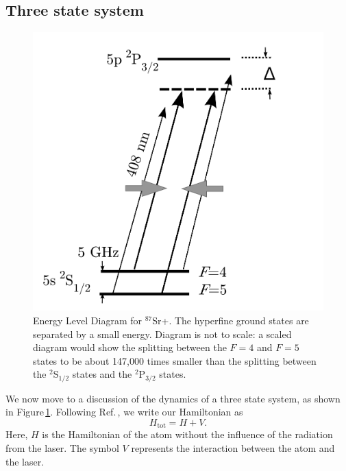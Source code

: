 \subsection{Three state system}
\begin{figure}
\centerline{
\includegraphics[totalheight=0.3\textheight]{E_level_from_proposal}
}
\caption[Energy level diagram for $^{87}$Sr+]{Energy Level Diagram for $^{87}$Sr+. The hyperfine ground states are separated by a small energy. Diagram is not to scale: a scaled diagram would show the splitting between the $F=4$ and $F=5$ states to be about 147,000 times smaller than the splitting between the $^2$S$_{1/2}$ states and the $^2$P$_{3/2}$ states.}
\label{energyLevelDiagramFigure}
\end{figure}
We now move to a discussion of the dynamics of a three state system, as shown in Figure\,\ref{energyLevelDiagramFigure}. Following Ref.\,\cite{Young1997363}, we write our Hamiltonian as
\begin{equation}
H_{\mathrm{tot}}=H+V.
\end{equation}
Here, $H$ is the Hamiltonian of the atom without the influence of the radiation from the laser. The symbol $V$ represents the interaction between the atom and the laser. 

